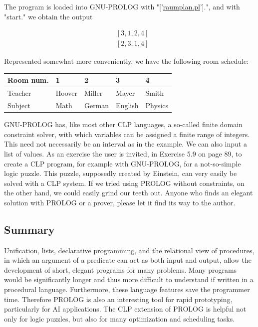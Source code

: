 \documentclass[10pt]{article}
\begin{document}
The program is loaded into GNU-PROLOG with "['\href{http://raumplan.pl}{raumplan.pl}'].", and with "start." we obtain the output

$$
\begin{aligned}
& {[3,1,2,4]} \\
& {[2,3,1,4]}
\end{aligned}
$$

Represented somewhat more conveniently, we have the following room schedule:

\begin{center}
\begin{tabular}{lllll}
\hline
Room num. & 1 & 2 & 3 & 4 \\
\hline
Teacher & Hoover & Miller & Mayer & Smith \\
\hline
Subject & Math & German & English & Physics \\
\hline
\end{tabular}
\end{center}

GNU-PROLOG has, like most other CLP languages, a so-called finite domain constraint solver, with which variables can be assigned a finite range of integers. This need not necessarily be an interval as in the example. We can also input a list of values. As an exercise the user is invited, in Exercise 5.9 on page 89, to create a CLP program, for example with GNU-PROLOG, for a not-so-simple logic puzzle. This puzzle, supposedly created by Einstein, can very easily be solved with a CLP system. If we tried using PROLOG without constraints, on the other hand, we could easily grind our teeth out. Anyone who finds an elegant solution with PROLOG or a prover, please let it find its way to the author.

\subsection*{Summary}
Unification, lists, declarative programming, and the relational view of procedures, in which an argument of a predicate can act as both input and output, allow the development of short, elegant programs for many problems. Many programs would be significantly longer and thus more difficult to understand if written in a procedural language. Furthermore, these language features save the programmer time. Therefore PROLOG is also an interesting tool for rapid prototyping, particularly for AI applications. The CLP extension of PROLOG is helpful not only for logic puzzles, but also for many optimization and scheduling tasks.
\end{document}
